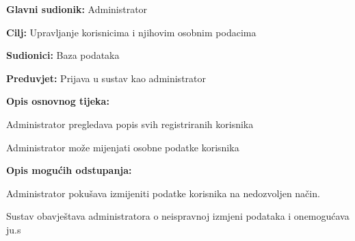 \noindent {}
\begin{packed_item}
	
	\item \textbf{Glavni sudionik: }Administrator
	\item  \textbf{Cilj:} Upravljanje korisnicima i njihovim osobnim podacima
	\item  \textbf{Sudionici:} Baza podataka
	\item  \textbf{Preduvjet:} Prijava u sustav kao administrator
	\item  \textbf{Opis osnovnog tijeka:}
	
	\item[] \begin{packed_enum}
		
		\item Administrator pregledava popis svih registriranih korisnika
		\item Administrator može mijenjati osobne podatke korisnika
		
	\end{packed_enum}
	
	\item  \textbf{Opis mogućih odstupanja:}
	
	\item[] \begin{packed_item}
		
		\item[2.a] Administrator pokušava izmijeniti podatke korisnika na nedozvoljen način.
		\item[] \begin{packed_enum}
			
			\item Sustav obavještava administratora o neispravnoj izmjeni podataka i onemogućava ju.s
			
		\end{packed_enum}
		
	\end{packed_item}
	
\end{packed_item}

